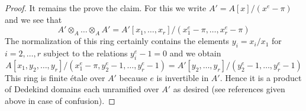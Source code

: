 \begin{proof}
\medskip\noindent
It remains the prove the claim. For this we write
$A' = A[x]/(x^e - \pi)$ and we see that
$$
A' \otimes_A \ldots \otimes_A A' =
A'[x_1, \ldots, x_r]/(x_1^e - \pi, \ldots, x_r^e - \pi)
$$
The normalization of this ring certainly contains the
elements $y_i = x_i/x_1$ for $i = 2, \ldots, r$ subject
to the relations $y_i^e - 1 = 0$ and
we obtain
$$
A[x_1, y_2, \ldots, y_r]/(x_1^e - \pi, y_2^e - 1, \ldots, y_r^e - 1) =
A'[y_2, \ldots, y_r]/(y_2^e - 1, \ldots, y_r^e - 1)
$$
This ring is finite \'etale over $A'$ because $e$ is invertible in $A'$.
Hence it is a product of Dedekind domains each unramified over $A'$
as desired (see references given above in case of confusion).
\end{proof}